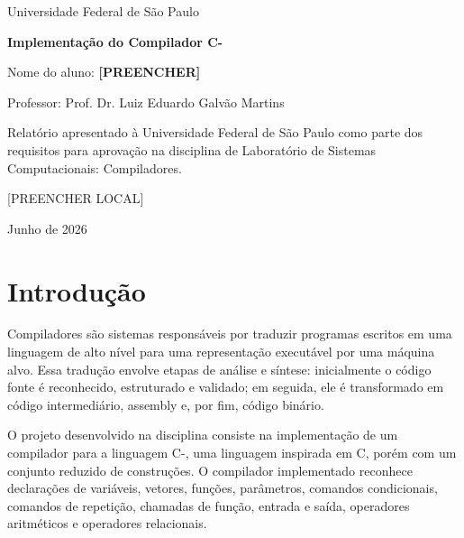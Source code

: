 \documentclass[12pt,a4paper]{report}
\begin{document}
\begin{titlepage}
    \centering
    \vspace*{2cm}

    {\Large Universidade Federal de São Paulo\par}
    \vspace{1.5cm}

    {\LARGE\textbf{Implementação do Compilador C-}\par}
    \vspace{2cm}

    {\large Nome do aluno: \textbf{[PREENCHER]}\par}
    \vspace{0.5cm}
    {\large Professor: Prof. Dr. Luiz Eduardo Galvão Martins\par}
    \vspace{2cm}

    \begin{minipage}{0.82\textwidth}
        \centering
        Relatório apresentado à Universidade Federal de São Paulo como parte dos requisitos para aprovação na disciplina de Laboratório de Sistemas Computacionais: Compiladores.
    \end{minipage}

    \vfill

    {\large [PREENCHER LOCAL]\par}
    {\large Junho de 2026\par}
\end{titlepage}

\tableofcontents
\clearpage

\chapter{Introdução}

Compiladores são sistemas responsáveis por traduzir programas escritos em uma linguagem de alto nível para uma representação executável por uma máquina alvo. Essa tradução envolve etapas de análise e síntese: inicialmente o código fonte é reconhecido, estruturado e validado; em seguida, ele é transformado em código intermediário, assembly e, por fim, código binário.

O projeto desenvolvido na disciplina consiste na implementação de um compilador para a linguagem C-, uma linguagem inspirada em C, porém com um conjunto reduzido de construções. O compilador implementado reconhece declarações de variáveis, vetores, funções, parâmetros, comandos condicionais, comandos de repetição, chamadas de função, entrada e saída, operadores aritméticos e operadores relacionais.
\end{document}
